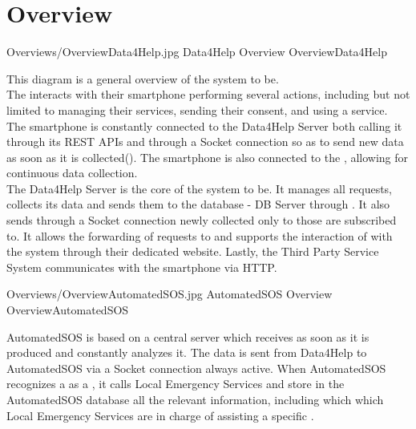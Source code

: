 \documentclass[../../DD.tex]{subfiles}
\begin{document}
\section{Overview}

	\image {13cm} {Overviews/OverviewData4Help.jpg} {Data4Help Overview} {OverviewData4Help}

	This diagram is a general overview of the system to be.\\
	The  interacts with their smartphone performing several actions, including but not limited to managing their services, sending their consent, and using a service. The smartphone is constantly connected to the Data4Help Server both calling it through its REST APIs and through a Socket connection so as to send new data as soon as it is collected(). The smartphone is also connected to the , allowing for continuous data collection.\\
	The Data4Help Server is the core of the system to be. It manages all  requests, collects its data and sends them to the database - DB Server through . It also sends through a Socket connection newly collected  only to those  are subscribed to. It allows the forwarding of  requests to  and supports the interaction of  with the system through their dedicated website.
	Lastly, the Third Party Service System communicates with the  smartphone via HTTP. 



	\image {13cm} {Overviews/OverviewAutomatedSOS.jpg} {AutomatedSOS Overview} {OverviewAutomatedSOS}

	AutomatedSOS is based on a central server which receives  as soon as it is produced and constantly analyzes it. The data is sent from Data4Help to AutomatedSOS via a Socket connection always active. When AutomatedSOS recognizes a  as a , it calls Local Emergency Services and store in the AutomatedSOS database all the relevant information, including which which Local Emergency Services are in charge of assisting a specific .


\end{document}
